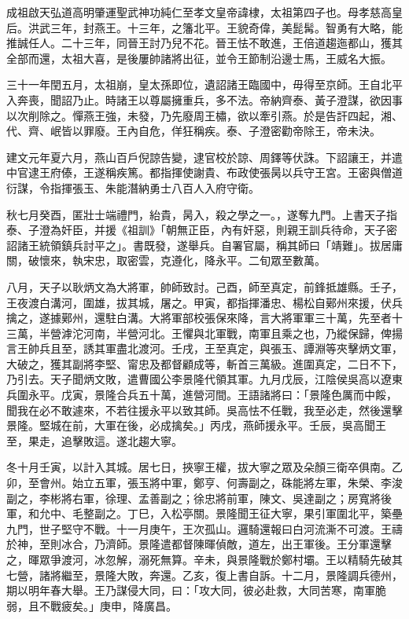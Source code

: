
\begin{pinyinscope}
成祖啟天弘道高明肇運聖武神功純仁至孝文皇帝諱棣，太祖第四子也。母孝慈高皇后。洪武三年，封燕王。十三年，之籓北平。王貌奇偉，美髭髯。智勇有大略，能推誠任人。二十三年，同晉王討乃兒不花。晉王怯不敢進，王倍道趨迤都山，獲其全部而還，太祖大喜，是後屢帥諸將出征，並令王節制沿邊士馬，王威名大振。

三十一年閏五月，太祖崩，皇太孫即位，遺詔諸王臨國中，毋得至京師。王自北平入奔喪，聞詔乃止。時諸王以尊屬擁重兵，多不法。帝納齊泰、黃子澄謀，欲因事以次削除之。憚燕王強，未發，乃先廢周王橚，欲以牽引燕。於是告訐四起，湘、代、齊、岷皆以罪廢。王內自危，佯狂稱疾。泰、子澄密勸帝除王，帝未決。

建文元年夏六月，燕山百戶倪諒告變，逮官校於諒、周鐸等伏誅。下詔讓王，并遣中官逮王府傣，王遂稱疾篤。都指揮使謝貴、布政使張昺以兵守王宮。王密與僧道衍謀，令指揮張玉、朱能潛納勇士八百人入府守衛。

秋七月癸酉，匿壯士端禮門，紿貴，昺入，殺之學之一。，遂奪九門。上書天子指泰、子澄為奸臣，并援《祖訓》「朝無正臣，內有奸惡，則親王訓兵待命，天子密詔諸王統領鎮兵討平之」。書既發，遂舉兵。自署官屬，稱其師曰「靖難」。拔居庸關，破懷來，執宋忠，取密雲，克遵化，降永平。二旬眾至數萬。

八月，天子以耿炳文為大將軍，帥師致討。己酉，師至真定，前鋒抵雄縣。壬子，王夜渡白溝河，圍雄，拔其城，屠之。甲寅，都指揮潘忠、楊松自鄚州來援，伏兵擒之，遂據鄚州，還駐白溝。大將軍部校張保來降，言大將軍軍三十萬，先至者十三萬，半營滹沱河南，半營河北。王懼與北軍戰，南軍且乘之也，乃縱保歸，俾揚言王帥兵且至，誘其軍盡北渡河。壬戌，王至真定，與張玉、譚淵等夾擊炳文軍，大破之，獲其副將李堅、甯忠及都督顧成等，斬首三萬級。進圍真定，二日不下，乃引去。天子聞炳文敗，遣曹國公李景隆代領其軍。九月戊辰，江陰侯吳高以遼東兵圍永平。戊寅，景隆合兵五十萬，進營河間。王語諸將曰：「景隆色厲而中餒，聞我在必不敢遽來，不若往援永平以致其師。吳高怯不任戰，我至必走，然後還擊景隆。堅城在前，大軍在後，必成擒矣。」丙戌，燕師援永平。壬辰，吳高聞王至，果走，追擊敗這。遂北趨大寧。

冬十月壬寅，以計入其城。居七日，挾寧王權，拔大寧之眾及朵顏三衛卒俱南。乙卯，至會州。始立五軍，張玉將中軍，鄭亨、何壽副之，硃能將左軍，朱榮、李浚副之，李彬將右軍，徐理、孟善副之；徐忠將前軍，陳文、吳達副之；房寬將後軍，和允中、毛整副之。丁巳，入松亭關。景隆聞王征大寧，果引軍圍北平，築壘九門，世子堅守不戰。十一月庚午，王次孤山。邏騎還報曰白河流澌不可渡。王禱於神，至則冰合，乃濟師。景隆遣都督陳暉偵敵，道左，出王軍後。王分軍還擊之，暉眾爭渡河，冰忽解，溺死無算。辛未，與景隆戰於鄭村壩。王以精騎先破其七營，諸將繼至，景隆大敗，奔還。乙亥，復上書自訴。十二月，景隆調兵德州，期以明年春大舉。王乃謀侵大同，曰：「攻大同，彼必赴救，大同苦寒，南軍脆弱，且不戰疲矣。」庚申，降廣昌。


\end{pinyinscope}
